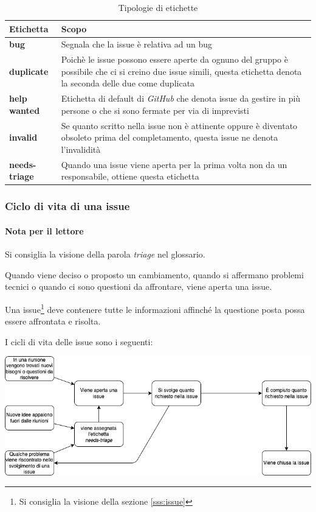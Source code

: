 \begin{table}[h]
    \centering
    \begin{tabularx}{\linewidth}{l | X}
        \textbf{Etichetta} & \textbf{Scopo}\\
        \hline
        \textbf{bug} & Segnala che la issue è relativa ad un bug \\
        \textbf{duplicate} & Poichè le issue possono essere aperte da ognuno del gruppo è possibile che ci si creino due issue simili, questa etichetta denota la seconda delle due come duplicata \\
        \textbf{help wanted } & Etichetta di default di \textit{GitHub} che denota issue da gestire in più persone o che si sono fermate per via di imprevisti\\
        \textbf{invalid} & Se quanto scritto nella issue non è attinente oppure è diventato obsoleto prima del completamento, questa issue ne denota l'invalidità\\
        \textbf{needs-triage} & Quando una issue viene aperta per la prima volta non da un responsabile, ottiene questa etichetta \\
    \end{tabularx}
    \caption{Tipologie di etichette}
    \label{table:t_etichette}
\end{table}

\subsubsection{Ciclo di vita di una issue}\label{sss:triage}

\paragraph{Nota per il lettore} Si consiglia la visione della parola \textit{triage} nel glossario.

Quando viene deciso o proposto un cambiamento, quando si affermano problemi tecnici o quando ci sono questioni da affrontare, viene aperta una issue.

Una issue\footnote{Si consiglia la visione della sezione \ref{sss:issue}} deve contenere tutte le informazioni affinché la questione posta possa essere affrontata e risolta.

I cicli di vita delle issue sono i seguenti:

\includegraphics[width=\linewidth]{img/ciclo-vita-issue.png}

